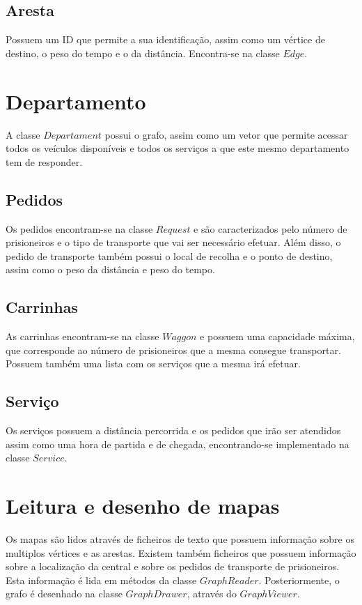 \documentclass[article, a4paper, 12pt, oneside]{memoir}
\begin{document}
\subsection{Aresta}
Possuem um ID que permite a sua identificação, assim como um vértice de destino, o peso do tempo e o da distância. Encontra-se na classe $Edge$.

\section{Departamento}
A classe $Departament$ possui o grafo, assim como um vetor que permite acessar todos os veículos disponíveis e todos os serviços a que este mesmo departamento tem de responder.

\subsection{Pedidos}
Os pedidos encontram-se na classe $Request$ e são caracterizados pelo número de prisioneiros e o tipo de transporte que vai ser necessário efetuar. Além disso, o pedido de transporte também possui o 
local de recolha e o ponto de destino, assim como o peso da distância e peso do tempo.

\subsection{Carrinhas}
As carrinhas encontram-se na classe $Waggon$ e possuem uma capacidade máxima, que corresponde ao número de prisioneiros que a mesma consegue transportar. Possuem também uma lista 
com os serviços que a mesma irá efetuar.

\subsection{Serviço}
Os serviços possuem a distância percorrida e os pedidos que irão ser atendidos assim como uma hora de partida e de chegada, encontrando-se implementado na classe $Service$.

\section{Leitura e desenho de mapas}
Os mapas são lidos através de ficheiros de texto que possuem informação sobre os multiplos vértices e as arestas. 
Existem também ficheiros que possuem informação sobre a localização da central e sobre os pedidos de transporte de prisioneiros. Esta informação é lida em métodos da classe $GraphReader$.
Posteriormente, o grafo é desenhado na classe $GraphDrawer$, através do $GraphViewer$.
\end{document}

